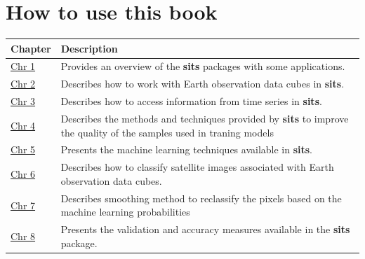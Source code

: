 \documentclass[a4paper,]{tufte-book}
\begin{document}
\hypertarget{how-to-use-this-book}{%
\section*{How to use this book}\label{how-to-use-this-book}}

\begin{longtable}[]{@{}
  >{\raggedright\arraybackslash}p{}
  >{\raggedright\arraybackslash}p{}@{}}
\toprule
\textbf{Chapter} & \textbf{Description} \\
\midrule
\endhead
\href{https://e-sensing.github.io/sitsbook/introduction.html}{Chr 1} & Provides an overview of the \textbf{sits} packages with some applications. \\
\href{https://e-sensing.github.io/sitsbook/earth-observation-data-cubes.html}{Chr 2} & Describes how to work with Earth observation data cubes in \textbf{sits}. \\
\href{https://e-sensing.github.io/sitsbook/acessing-time-series-information-in-sits.html}{Chr 3} & Describes how to access information from time series in \textbf{sits}. \\
\href{https://e-sensing.github.io/sitsbook/time-series-clustering-to-improve-the-quality-of-training-samples.html}{Chr 4} & Describes the methods and techniques provided by \textbf{sits} to improve the quality of the samples used in traning models \\
\href{https://e-sensing.github.io/sitsbook/machine-learning-for-data-cubes-using-the-sits-package.html}{Chr 5} & Presents the machine learning techniques available in \textbf{sits}. \\
\href{https://e-sensing.github.io/sitsbook/classification-of-images-in-data-cubes-using-satellite-image-time-series.html}{Chr 6} & Describes how to classify satellite images associated with Earth observation data cubes. \\
\href{https://e-sensing.github.io/sitsbook/post-classification-smoothing-using-bayesian-techniques-in-sits.html}{Chr 7} & Describes smoothing method to reclassify the pixels based on the machine learning probabilities \\
\href{https://e-sensing.github.io/sitsbook/validation-and-accuracy-measurements-in-sits.html}{Chr 8} & Presents the validation and accuracy measures available in the \textbf{sits} package. \\
\bottomrule
\end{longtable}
\end{document}
